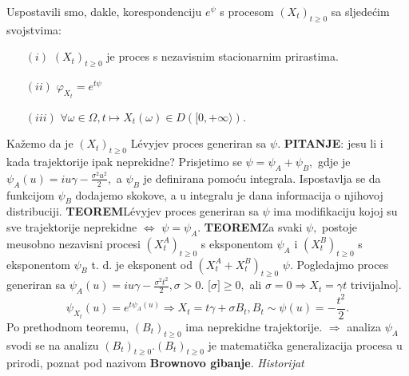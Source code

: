 \documentclass{article}
\begin{document}
Uspostavili smo, dakle, korespondenciju \(e^\psi\) s procesom \((X_t)_{t\ge0}\) sa sljedećim svojstvima:
\begin{enumerate}
    \item[\((i)\)] \((X_t)_{t\ge0}\) je proces s nezavisnim stacionarnim prirastima.
    \item[\((ii)\)] \(\varphi_{X_t}=e^{t\psi}\)
    \item[\((iii)\)] \(\forall\omega\in\Omega,t\mapsto X_t(\omega)\in D\left([0,+\infty\rangle\right).\) 
\end{enumerate} Kažemo da je \((X_t)_{t\ge0}\) L\'evyjev proces generiran sa \(\psi.\)\newline\newline
\textbf{PITANJE}: jesu li i kada trajektorije ipak neprekidne? Prisjetimo se \(\psi=\psi_A+\psi_B,\) gdje je \(\psi_A(u)=iu\gamma-\frac{\sigma^2u^2}2,\) a \(\psi_B\) je definirana pomoću integrala. Ispostavlja se da funkcijom \(\psi_B\) dodajemo skokove, a u integralu je dana informacija o njihovoj distribuciji.\newline\newline
\textbf{TEOREM}\newline L\'evyjev proces generiran sa \(\psi\) ima modifikaciju kojoj su sve trajektorije neprekidne \(\Leftrightarrow\) \(\psi=\psi_A.\)\newline\newline
\textbf{TEOREM}\newline Za svaki \(\psi,\) postoje me\dj{}usobno nezavisni procesi \((X_t^A)_{t\ge0}\) s eksponentom \(\psi_A\) i \((X_t^B)_{t\ge0}\) s eksponentom \(\psi_B\) t. d. je eksponent od \(\left(X_t^A+X_t^B\right)_{t\ge0}\) \(\psi.\)\newline\newline
Pogledajmo proces generiran sa \(\psi_A(u)=iu\gamma-\frac{\sigma^2t^2}2,\sigma>0.\) [\(\sigma]\ge0,\) ali \(\sigma=0\Rightarrow X_t=\gamma t\) trivijalno]. \[\psi_{X_t}(u)=e^{t\psi_A(u)}\Rightarrow X_t=t\gamma+\sigma B_t, B_t\sim\psi(u)=-\frac{t^2}2.\] Po prethodnom teoremu, \((B_t)_{t\ge0}\) ima neprekidne trajektorije. \(\Rightarrow\) analiza \(\psi_A\) svodi se na analizu \((B_t)_{t\ge0}.\)\newline\newline \((B_t)_{t\ge0}\) je matematička generalizacija procesa u prirodi, poznat pod nazivom \textbf{Brownovo gibanje}.\newline\newline
\emph{Historijat}
\end{document}
